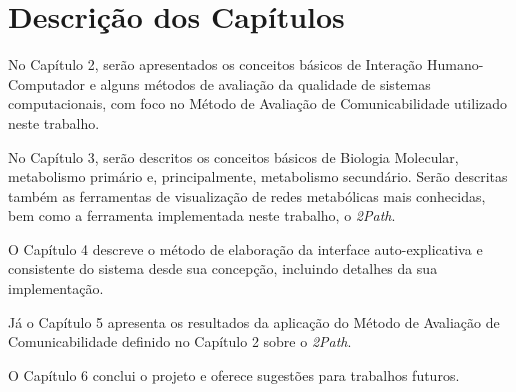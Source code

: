\section{Descrição dos Capítulos}
\indent No Capítulo 2, serão apresentados os conceitos básicos de Interação Humano-Computador e alguns métodos de avaliação da qualidade de sistemas computacionais, com foco no Método de Avaliação de Comunicabilidade utilizado neste trabalho.

\indent No Capítulo 3, serão descritos os conceitos básicos de Biologia Molecular, metabolismo primário e, principalmente, metabolismo secundário. Serão descritas também as ferramentas de visualização de redes metabólicas mais conhecidas, bem como a ferramenta implementada neste trabalho, o \textit{2Path}.

\indent O Capítulo 4 descreve o método de elaboração da interface auto-explicativa e consistente do sistema desde sua concepção, incluindo detalhes da sua implementação.

\indent Já o Capítulo 5 apresenta os resultados da aplicação do Método de Avaliação de Comunicabilidade definido no Capítulo 2 sobre o \textit{2Path}.

\indent O Capítulo 6  conclui o projeto e oferece sugestões para trabalhos futuros.